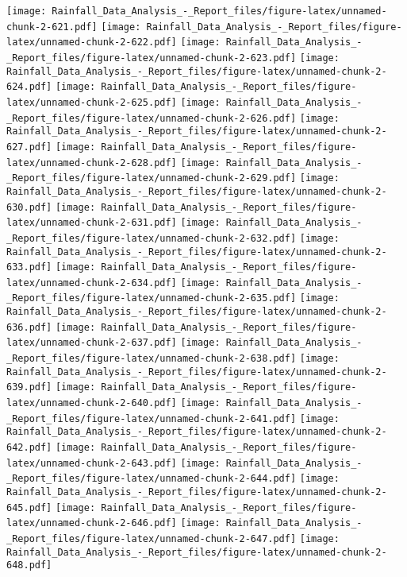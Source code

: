 \documentclass[
]{article}
\begin{document}
\texttt{[image: Rainfall\_Data\_Analysis\_-\_Report\_files/figure-latex/unnamed-chunk-2-621.pdf]}
\texttt{[image: Rainfall\_Data\_Analysis\_-\_Report\_files/figure-latex/unnamed-chunk-2-622.pdf]}
\texttt{[image: Rainfall\_Data\_Analysis\_-\_Report\_files/figure-latex/unnamed-chunk-2-623.pdf]}
\texttt{[image: Rainfall\_Data\_Analysis\_-\_Report\_files/figure-latex/unnamed-chunk-2-624.pdf]}
\texttt{[image: Rainfall\_Data\_Analysis\_-\_Report\_files/figure-latex/unnamed-chunk-2-625.pdf]}
\texttt{[image: Rainfall\_Data\_Analysis\_-\_Report\_files/figure-latex/unnamed-chunk-2-626.pdf]}
\texttt{[image: Rainfall\_Data\_Analysis\_-\_Report\_files/figure-latex/unnamed-chunk-2-627.pdf]}
\texttt{[image: Rainfall\_Data\_Analysis\_-\_Report\_files/figure-latex/unnamed-chunk-2-628.pdf]}
\texttt{[image: Rainfall\_Data\_Analysis\_-\_Report\_files/figure-latex/unnamed-chunk-2-629.pdf]}
\texttt{[image: Rainfall\_Data\_Analysis\_-\_Report\_files/figure-latex/unnamed-chunk-2-630.pdf]}
\texttt{[image: Rainfall\_Data\_Analysis\_-\_Report\_files/figure-latex/unnamed-chunk-2-631.pdf]}
\texttt{[image: Rainfall\_Data\_Analysis\_-\_Report\_files/figure-latex/unnamed-chunk-2-632.pdf]}
\texttt{[image: Rainfall\_Data\_Analysis\_-\_Report\_files/figure-latex/unnamed-chunk-2-633.pdf]}
\texttt{[image: Rainfall\_Data\_Analysis\_-\_Report\_files/figure-latex/unnamed-chunk-2-634.pdf]}
\texttt{[image: Rainfall\_Data\_Analysis\_-\_Report\_files/figure-latex/unnamed-chunk-2-635.pdf]}
\texttt{[image: Rainfall\_Data\_Analysis\_-\_Report\_files/figure-latex/unnamed-chunk-2-636.pdf]}
\texttt{[image: Rainfall\_Data\_Analysis\_-\_Report\_files/figure-latex/unnamed-chunk-2-637.pdf]}
\texttt{[image: Rainfall\_Data\_Analysis\_-\_Report\_files/figure-latex/unnamed-chunk-2-638.pdf]}
\texttt{[image: Rainfall\_Data\_Analysis\_-\_Report\_files/figure-latex/unnamed-chunk-2-639.pdf]}
\texttt{[image: Rainfall\_Data\_Analysis\_-\_Report\_files/figure-latex/unnamed-chunk-2-640.pdf]}
\texttt{[image: Rainfall\_Data\_Analysis\_-\_Report\_files/figure-latex/unnamed-chunk-2-641.pdf]}
\texttt{[image: Rainfall\_Data\_Analysis\_-\_Report\_files/figure-latex/unnamed-chunk-2-642.pdf]}
\texttt{[image: Rainfall\_Data\_Analysis\_-\_Report\_files/figure-latex/unnamed-chunk-2-643.pdf]}
\texttt{[image: Rainfall\_Data\_Analysis\_-\_Report\_files/figure-latex/unnamed-chunk-2-644.pdf]}
\texttt{[image: Rainfall\_Data\_Analysis\_-\_Report\_files/figure-latex/unnamed-chunk-2-645.pdf]}
\texttt{[image: Rainfall\_Data\_Analysis\_-\_Report\_files/figure-latex/unnamed-chunk-2-646.pdf]}
\texttt{[image: Rainfall\_Data\_Analysis\_-\_Report\_files/figure-latex/unnamed-chunk-2-647.pdf]}
\texttt{[image: Rainfall\_Data\_Analysis\_-\_Report\_files/figure-latex/unnamed-chunk-2-648.pdf]}
\end{document}
